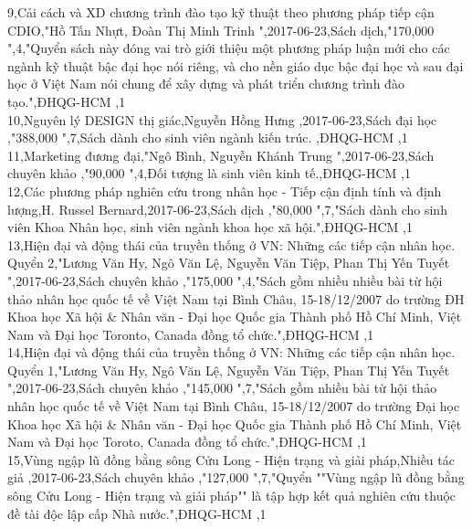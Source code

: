 \documentclass[a4paper]{article}
\begin{document}
9,Cải cách và XD chương trình đào tạo kỹ thuật theo phương pháp tiếp cận CDIO,"Hồ Tấn Nhựt, Đoàn Thị Minh Trinh ",2017-06-23,Sách dịch,"170,000 ",4,"Quyển sách này đóng vai trò giới thiệu một phương pháp luận mới cho các ngành kỹ thuật bậc đại học nói riêng, và cho nền giáo dục bậc đại học và sau đại học ở Việt Nam nói chung để xây dựng và phát triển chương trình đào tạo.",ĐHQG-HCM ,1\\
10,Nguyên lý DESIGN thị giác,Nguyễn Hồng Hưng ,2017-06-23,Sách đại học ,"388,000 ",7,Sách dành cho sinh viên ngành kiến trúc. ,ĐHQG-HCM ,1\\
11,Marketing đương đại,"Ngô Bình, Nguyễn Khánh Trung ",2017-06-23,Sách chuyên khảo ,"90,000 ",4,Đối tượng là sinh viên kinh tế.,ĐHQG-HCM ,1\\
12,Các phương pháp nghiên cứu trong nhân học - Tiếp cận định tính và định lượng,H. Russel Bernard,2017-06-23,Sách dịch ,"80,000 ",7,"Sách dành cho sinh viên Khoa Nhân học, sinh viên ngành khoa học xã hội.",ĐHQG-HCM ,1\\
13,Hiện đại và động thái của truyền thống ở VN: Những các tiếp cận nhân học. Quyển 2,"Lương Văn Hy, Ngô Văn Lệ, Nguyễn Văn Tiệp, Phan Thị Yến Tuyết ",2017-06-23,Sách chuyên khảo ,"175,000 ",4,"Sách gồm nhiều nhiều bài từ hội thảo nhân học quốc tế về Việt Nam tại Bình Châu, 15-18/12/2007 do trường ĐH Khoa học Xã hội \& Nhân văn - Đại học Quốc gia Thành  phố Hồ Chí Minh, Việt Nam và Đại học Toronto, Canada đồng tổ chức.",ĐHQG-HCM ,1\\
14,Hiện đại và động thái của truyền thống ở VN: Những các tiếp cận nhân học. Quyển 1,"Lương Văn Hy, Ngô Văn Lệ, Nguyễn Văn Tiệp, Phan Thị Yến Tuyết ",2017-06-23,Sách chuyên khảo ,"145,000 ",7,"Sách gồm nhiều bài từ hội thảo nhân học quốc tế về Việt Nam tại Bình Châu, 15-18/12/2007 do trường Đại học Khoa học Xã hội \& Nhân văn - Đại học Quốc gia Thành phố Hồ Chí Minh, Việt Nam và Đại học Toroto, Canada đồng tổ chức.",ĐHQG-HCM ,1\\
15,Vùng ngập lũ đồng bằng sông Cửu Long - Hiện trạng và giải pháp,Nhiều tác giả ,2017-06-23,Sách chuyên khảo ,"127,000 ",7,"Quyển ""Vùng ngập lũ đồng bằng sông Cửu Long - Hiện trạng và giải pháp"" là tập hợp kết quả nghiên cứu thuộc đề tài độc lập cấp Nhà nước.",ĐHQG-HCM ,1\\
\end{document}
